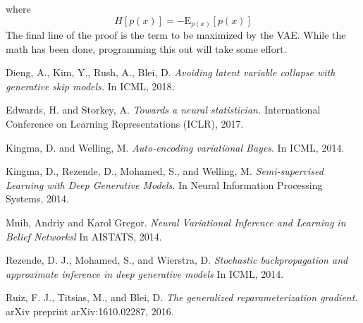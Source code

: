 \documentclass[10pt]{article}
\begin{document}
where 
\begin{equation} \label{Entropy}
H[p(x)] = -\mathrm{E}_{p(x)}[p(x)]
\end{equation}
 The final line of the proof is the term to be maximized by the VAE.  While the math has been done, programming this out will take some effort.
\begin{thebibliography}{14}
Dieng, A., Kim, Y., Rush, A., Blei, D.
\textit{ Avoiding latent variable collapse with generative skip models.}
In ICML, 2018.

Edwards, H. and Storkey, A. \textit{Towards a neural
statistician.} International Conference on Learning Representations (ICLR), 2017.

Kingma, D. and Welling, M. 
\textit{ Auto-encoding variational Bayes}. 
In ICML, 2014.
 
Kingma, D., Rezende, D., Mohamed, S., and Welling, M. 
\textit{Semi-supervised Learning with Deep Generative Models}.  
In Neural Information Processing Systems, 2014.
 
Mnih, Andriy and  Karol Gregor.
\textit{Neural Variational Inference and Learning in Belief Networksl}
In AISTATS, 2014.

Rezende, D. J., Mohamed, S., and Wierstra, D.
\textit{Stochastic backpropagation and approximate inference in deep generative models}
In ICML, 2014.

Ruiz, F. J., Titsias, M., and Blei, D.
\textit{The generalized reparameterization
	gradient.}
arXiv preprint arXiv:1610.02287, 2016.
\end{thebibliography}
\end{document}
